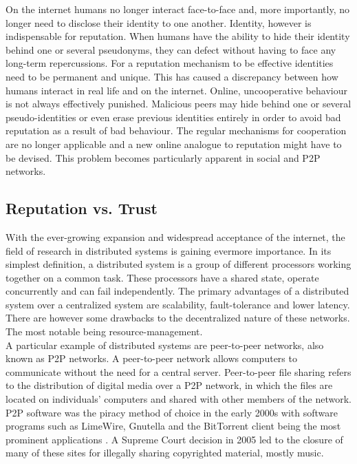 \documentclass[11pt,a4paper]{report}
\theoremstyle{definition}
\theoremstyle{theorem}
\theoremstyle{proposition}
\theoremstyle{corollary}
\theoremstyle{lemma}
\theoremstyle{example}
\theoremstyle{remark}
\begin{document}
\noindent{}On the internet humans no longer interact face-to-face and, more importantly, no longer need to disclose their identity to one another. Identity, however is indispensable for reputation. When humans have the ability to hide their identity behind one or several pseudonyms, they can defect without having to face any long-term repercussions. For a reputation mechanism to be effective identities need to be permanent and unique. This has caused a discrepancy between how humans interact in real life and on the internet. Online, uncooperative behaviour is not always effectively punished. Malicious peers may hide behind one or several pseudo-identities or even erase previous identities entirely in order to avoid bad reputation as a result of bad behaviour. The regular mechanisms for cooperation are no longer applicable and a new online analogue to reputation might have to be devised. This problem becomes particularly apparent in social and P2P networks.\vspace{1em}\\

\subsection{Reputation vs. Trust}
\label{subsec:Reputation vs. Trust}

\noindent{}With the ever-growing expansion and widespread acceptance of the internet, the field of research in distributed systems is gaining evermore importance. In its simplest definition, a distributed system is a group of different processors working together on a common task. These processors have a shared state, operate concurrently and can fail independently. The primary advantages of a distributed system over a centralized system are scalability, fault-tolerance and lower latency. There are however some drawbacks to the decentralized nature of these networks. The most notable being resource-management.\vspace{1em}\\

\noindent{}A particular example of distributed systems are peer-to-peer networks, also known as P2P networks. A peer-to-peer network allows computers to communicate without the need for a central server. Peer-to-peer file sharing refers to the distribution of digital media over a P2P network, in which the files are located on individuals' computers and shared with other members of the network. P2P software was the piracy method of choice in the early 2000s with software programs such as LimeWire, Gnutella and the BitTorrent client being the most prominent applications \cite{The Early Days of Mass Internet Piracy Were Awesome Yet Awful}. A Supreme Court decision in 2005 led to the closure of many of these sites for illegally sharing copyrighted material, mostly music.\vspace{1em}\\
\end{document}
